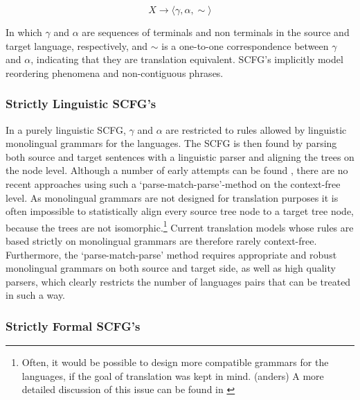 \documentclass{report}
\theoremstyle{definition}
\theoremstyle{plain}
\begin{document}
\[
X \to \langle \gamma , \alpha , \sim \rangle
\]

In which $\gamma$ and $\alpha$ are sequences of terminals and non terminals in the source and target language, respectively, and $\sim$ is a one-to-one correspondence between $\gamma$ and $\alpha$, indicating that they are translation equivalent. SCFG's implicitly model reordering phenomena and non-contiguous phrases.

\subsubsection{Strictly Linguistic SCFG's}

In a purely linguistic SCFG, $\gamma$ and $\alpha$ are restricted to rules allowed by linguistic monolingual grammars for the languages. The SCFG is then found by parsing both source and target sentences with a linguistic parser and aligning the trees on the node level. Although a number of early attempts can be found \citep[see][p. 20]{wu1997stochastic}, there are no recent approaches using such a `parse-match-parse'-method on the context-free level. As monolingual grammars are not designed for translation purposes it is often impossible to statistically align every source tree node to a target tree node, because the trees are not isomorphic.\footnote{Often, it would be possible to design more compatible grammars for the languages, if the goal of translation was kept in mind. (anders) A more detailed discussion of this issue can be found in \cite{rosetta1994compositional}} Current translation models whose rules are based strictly on monolingual grammars are therefore rarely context-free. Furthermore, the `parse-match-parse' method requires appropriate and robust monolingual grammars on both source and target side, as well as high quality parsers, which clearly restricts the number of languages pairs that can be treated in such a way.

\subsubsection{Strictly Formal SCFG's}
\end{document}
